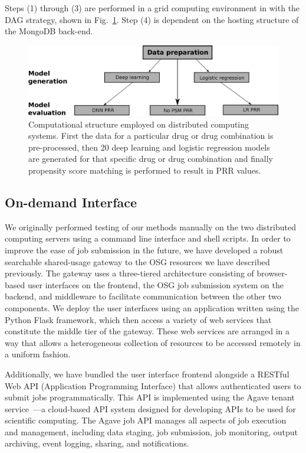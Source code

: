 \documentclass{ws-procs11x85}
\begin{document}
Steps (1) through (3) are performed in a grid computing environment in
with the DAG strategy, shown in Fig.~\ref{fig:dag}.  Step (4) is
dependent on the hosting structure of the MongoDB back-end.

\begin{figure}[h]
\centerline{\includegraphics[width=\textwidth]{dag}}
\caption{Computational structure employed on distributed computing
  systems. First the data for a particular drug or drug combination is
  pre-processed, then 20 deep learning and logistic regression models
  are generated for that specific drug or drug combination and finally
  propensity score matching is performed to result in PRR values.}
\label{fig:dag}
\end{figure}


\subsection{On-demand Interface}
We originally performed testing of our methods manually on the two
distributed computing servers using a command line interface and shell
scripts. In order to improve the ease of job submission in the future,
we have developed a robust searchable shared-usage gateway to the OSG
resources we have described previously. The gateway uses a
three-tiered architecture consisting of browser-based user interfaces
on the frontend, the OSG job submission system on the backend, and
middleware to facilitate communication between the other two
components. We deploy the user interfaces using an application written
using the Python Flask framework, which then access a variety of web
services that constitute the middle tier of the gateway. These web
services are arranged in a way that allows a heterogeneous collection
of resources to be accessed remotely in a uniform fashion.

Additionally, we have bundled the user interface frontend alongside a
RESTful Web API (Application Programming Interface) that allows
authenticated users to submit jobs programmatically. This API is
implemented using the Agave tenant service~\cite{dooley2012agave}---a
cloud-based API system designed for developing APIs to be used for
scientific computing. The Agave job API manages all aspects of job
execution and management, including data staging, job submission, job
monitoring, output archiving, event logging, sharing, and
notifications.
\end{document}
